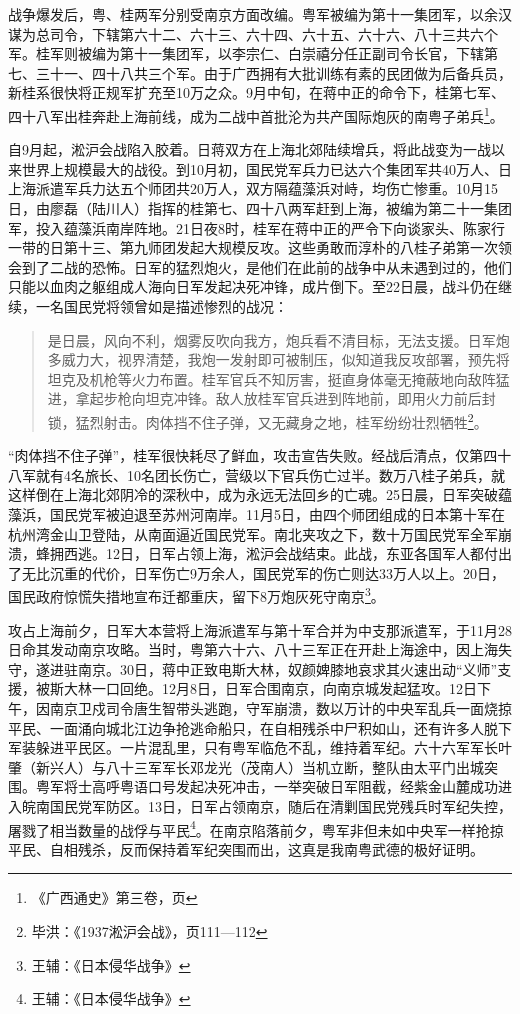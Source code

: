 战争爆发后，粤、桂两军分别受南京方面改编。粤军被编为第十一集团军，以余汉谋为总司令，下辖第六十二、六十三、六十四、六十五、六十六、八十三共六个军。桂军则被编为第十一集团军，以李宗仁、白崇禧分任正副司令长官，下辖第七、三十一、四十八共三个军。由于广西拥有大批训练有素的民团做为后备兵员，新桂系很快将正规军扩充至10万之众。9月中旬，在蒋中正的命令下，桂第七军、四十八军出桂奔赴上海前线，成为二战中首批沦为共产国际炮灰的南粤子弟兵\footnote{《广西通史》第三卷，页}。

自9月起，淞沪会战陷入胶着。日蒋双方在上海北郊陆续增兵，将此战变为一战以来世界上规模最大的战役。到10月初，国民党军兵力已达六个集团军共40万人、日上海派遣军兵力达五个师团共20万人，双方隔蕴藻浜对峙，均伤亡惨重。10月15日，由廖磊（陆川人）指挥的桂第七、四十八两军赶到上海，被编为第二十一集团军，投入蕴藻浜南岸阵地。21日夜8时，桂军在蒋中正的严令下向谈家头、陈家行一带的日第十三、第九师团发起大规模反攻。这些勇敢而淳朴的八桂子弟第一次领会到了二战的恐怖。日军的猛烈炮火，是他们在此前的战争中从未遇到过的，他们只能以血肉之躯组成人海向日军发起决死冲锋，成片倒下。至22日晨，战斗仍在继续，一名国民党将领曾如是描述惨烈的战况：

\begin{quote}

是日晨，风向不利，烟雾反吹向我方，炮兵看不清目标，无法支援。日军炮多威力大，视界清楚，我炮一发射即可被制压，似知道我反攻部署，预先将坦克及机枪等火力布置。桂军官兵不知厉害，挺直身体毫无掩蔽地向敌阵猛进，拿起步枪向坦克冲锋。敌人放桂军官兵进到阵地前，即用火力前后封锁，猛烈射击。肉体挡不住子弹，又无藏身之地，桂军纷纷壮烈牺牲\footnote{毕洪：《1937淞沪会战》，页111—112}。

\end{quote}

“肉体挡不住子弹”，桂军很快耗尽了鲜血，攻击宣告失败。经战后清点，仅第四十八军就有4名旅长、10名团长伤亡，营级以下官兵伤亡过半。数万八桂子弟兵，就这样倒在上海北郊阴冷的深秋中，成为永远无法回乡的亡魂。25日晨，日军突破蕴藻浜，国民党军被迫退至苏州河南岸。11月5日，由四个师团组成的日本第十军在杭州湾金山卫登陆，从南面逼近国民党军。南北夹攻之下，数十万国民党军全军崩溃，蜂拥西逃。12日，日军占领上海，淞沪会战结束。此战，东亚各国军人都付出了无比沉重的代价，日军伤亡9万余人，国民党军的伤亡则达33万人以上。20日，国民政府惊慌失措地宣布迁都重庆，留下8万炮灰死守南京\footnote{王辅：《日本侵华战争》}。

攻占上海前夕，日军大本营将上海派遣军与第十军合并为中支那派遣军，于11月28日命其发动南京攻略。当时，粤第六十六、八十三军正在开赴上海途中，因上海失守，遂进驻南京。30日，蒋中正致电斯大林，奴颜婢膝地哀求其火速出动“义师”支援，被斯大林一口回绝。12月8日，日军合围南京，向南京城发起猛攻。12日下午，因南京卫戍司令唐生智带头逃跑，守军崩溃，数以万计的中央军乱兵一面烧掠平民、一面涌向城北江边争抢逃命船只，在自相残杀中尸积如山，还有许多人脱下军装躲进平民区。一片混乱里，只有粤军临危不乱，维持着军纪。六十六军军长叶肇（新兴人）与八十三军军长邓龙光（茂南人）当机立断，整队由太平门出城突围。粤军将士高呼粤语口号发起决死冲击，一举突破日军阻截，经紫金山麓成功进入皖南国民党军防区。13日，日军占领南京，随后在清剿国民党残兵时军纪失控，屠戮了相当数量的战俘与平民\footnote{王辅：《日本侵华战争》}。在南京陷落前夕，粤军非但未如中央军一样抢掠平民、自相残杀，反而保持着军纪突围而出，这真是我南粤武德的极好证明。


